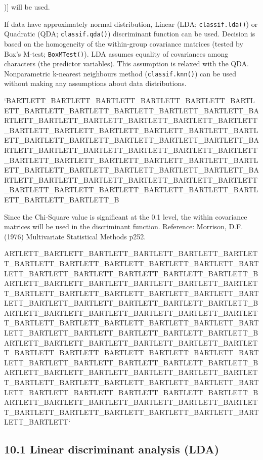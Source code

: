 \documentclass[
]{article}
\begin{document}
){]} will be used.

If data have approximately normal distribution, Linear (LDA;
\texttt{classif.lda()}) or Quadratic (QDA; \texttt{classif.qda()})
discriminant function can be used. Decision is based on the homogeneity
of the within-group covariance matrices (tested by Box's M-test;
\texttt{BoxMTest()}). LDA assumes equality of covariances among
characters (the predictor variables). This assumption is relaxed with
the QDA.\\
Nonparametric k-nearest neighbours method (\texttt{classif.knn()}) can
be used without making any assumptions about data distributions.

`BARTLETT\_BARTLETT\_BARTLETT\_BARTLETT\_BARTLETT\_BARTLETT\_BARTLETT\_BARTLETT\_BARTLETT\_BARTLETT\_BARTLETT\_BARTLETT\_BARTLETT\_BARTLETT\_BARTLETT\_BARTLETT\_BARTLETT\_BARTLETT\_BARTLETT\_BARTLETT\_BARTLETT\_BARTLETT\_BARTLETT\_BARTLETT\_BARTLETT\_BARTLETT\_BARTLETT\_BARTLETT\_BARTLETT\_BARTLETT\_BARTLETT\_BARTLETT\_BARTLETT\_BARTLETT\_BARTLETT\_BARTLETT\_BARTLETT\_BARTLETT\_BARTLETT\_BARTLETT\_BARTLETT\_BARTLETT\_BARTLETT\_BARTLETT\_BARTLETT\_BARTLETT\_BARTLETT\_BARTLETT\_BARTLETT\_BARTLETT\_BARTLETT\_BARTLETT\_BARTLETT\_BARTLETT\_BARTLETT\_BARTLETT\_BARTLETT\_BARTLETT\_BARTLETT\_B

Since the Chi-Square value is significant at the 0.1 level, the within
covariance matrices will be used in the discriminant function.
Reference: Morrison, D.F. (1976) Multivariate Statistical Methods p252.

ARTLETT\_BARTLETT\_BARTLETT\_BARTLETT\_BARTLETT\_BARTLETT\_BARTLETT\_BARTLETT\_BARTLETT\_BARTLETT\_BARTLETT\_BARTLETT\_BARTLETT\_BARTLETT\_BARTLETT\_BARTLETT\_BARTLETT\_BARTLETT\_BARTLETT\_BARTLETT\_BARTLETT\_BARTLETT\_BARTLETT\_BARTLETT\_BARTLETT\_BARTLETT\_BARTLETT\_BARTLETT\_BARTLETT\_BARTLETT\_BARTLETT\_BARTLETT\_BARTLETT\_BARTLETT\_BARTLETT\_BARTLETT\_BARTLETT\_BARTLETT\_BARTLETT\_BARTLETT\_BARTLETT\_BARTLETT\_BARTLETT\_BARTLETT\_BARTLETT\_BARTLETT\_BARTLETT\_BARTLETT\_BARTLETT\_BARTLETT\_BARTLETT\_BARTLETT\_BARTLETT\_BARTLETT\_BARTLETT\_BARTLETT\_BARTLETT\_BARTLETT\_BARTLETT\_BARTLETT\_BARTLETT\_BARTLETT\_BARTLETT\_BARTLETT\_BARTLETT\_BARTLETT\_BARTLETT\_BARTLETT\_BARTLETT\_BARTLETT\_BARTLETT\_BARTLETT\_BARTLETT\_BARTLETT\_BARTLETT\_BARTLETT\_BARTLETT\_BARTLETT\_BARTLETT\_BARTLETT\_BARTLETT\_BARTLETT\_BARTLETT\_BARTLETT\_BARTLETT\_BARTLETT\_BARTLETT\_BARTLETT\_BARTLETT\_BARTLETT\_BARTLETT\_BARTLETT\_BARTLETT\_BARTLETT\_BARTLETT\_BARTLETT\_BARTLETT\_BARTLETT`

\hypertarget{linear-discriminant-analysis-lda}{%
\subsection{10.1 Linear discriminant analysis
(LDA)}\label{linear-discriminant-analysis-lda}}
\end{document}
